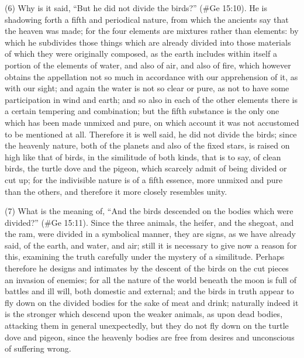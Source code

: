 (6) Why is it said, ``But he did not divide the birds?'' (\#Ge 15:10). He is shadowing forth a fifth
and periodical nature, from which the ancients say that the heaven was made; for the four
elements are mixtures rather than elements: by which he subdivides those things which are already
divided into those materials of which they were originally composed, as the earth includes within
itself a portion of the elements of water, and also of air, and also of fire, which however obtains the
appellation not so much in accordance with our apprehension of it, as with our sight; and again the
water is not so clear or pure, as not to have some participation in wind and earth; and so also in
each of the other elements there is a certain tempering and combination; but the fifth substance is
the only one which has been made unmixed and pure, on which account it was not accustomed to
be mentioned at all. Therefore it is well said, he did not divide the birds; since the heavenly nature,
both of the planets and also of the fixed stars, is raised on high like that of birds, in the similitude of
both kinds, that is to say, of clean birds, the turtle dove and the pigeon, which scarcely admit of
being divided or cut up; for the indivisible nature is of a fifth essence, more unmixed and pure than
the others, and therefore it more closely resembles unity.

(7) What is the meaning of, ``And the birds descended on the bodies which were divided?''
(\#Ge 15:11). Since the three animals, the heifer, and the shegoat, and the ram, were divided in
a symbolical manner, they are signs, as we have already said, of the earth, and water, and air; still
it is necessary to give now a reason for this, examining the truth carefully under the mystery of a
similitude. Perhaps therefore he designs and intimates by the descent of the birds on the cut
pieces an invasion of enemies; for all the nature of the world beneath the moon is full of battles and
ill will, both domestic and external; and the birds in truth appear to fly down on the divided bodies for
the sake of meat and drink; naturally indeed it is the stronger which descend upon the weaker
animals, as upon dead bodies, attacking them in general unexpectedly, but they do not fly down on
the turtle dove and pigeon, since the heavenly bodies are free from desires and unconscious of
suffering wrong.

